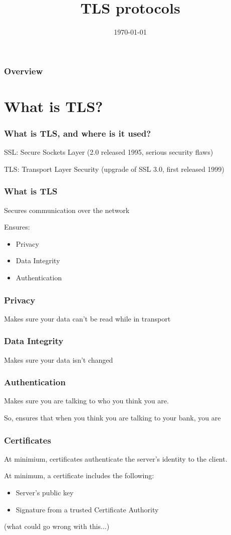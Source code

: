 \documentclass{beamer}
\title{TLS protocols}
\date{\today}
\begin{document}
\begin{frame}
\titlepage
\end{frame}

\begin{frame}
\frametitle{Overview}
\tableofcontents
\end{frame}

\section{What is TLS?}

\begin{frame}
\frametitle{What is TLS, and where is it used?}
  SSL: Secure Sockets Layer (2.0 released 1995, serious security flaws)

  TLS: Transport Layer Security (upgrade of SSL 3.0, first released 1999)
\end{frame}

\begin{frame}
  \frametitle{What is TLS}
Secures communication over the network

Ensures:
  \begin {itemize}
    \item Privacy
    \item Data Integrity
    \item Authentication
  \end {itemize}
\end{frame}

\begin{frame}
  \frametitle{Privacy}
Makes sure your data can't be read while in transport
\end{frame}

\begin{frame}
  \frametitle{Data Integrity}
Makes sure your data isn't changed
\end{frame}

\begin{frame}
  \frametitle{Authentication}
Makes sure you are talking to who you think you are.

So, ensures that when you think you are talking to your bank, you are
\end{frame}

\begin{frame}
  \frametitle{Certificates}
At minimium, certificates authenticate the server's identity to the client.

At minimum, a certificate includes the following:
  \begin{itemize}
    \item Server's public key
    \item Signature from a trusted Certificate Authority
  \end{itemize}

(what could go wrong with this...)
\end{frame}
\end{document}
